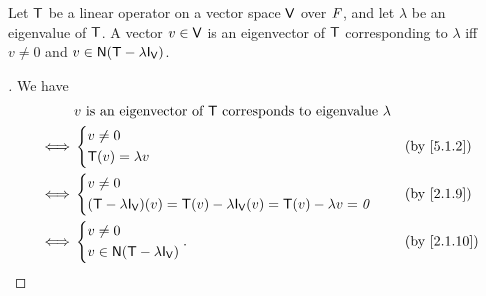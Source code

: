 \begin{thm}\label{5.4}
	Let \(\mathsf{T}\) be a linear operator on a vector space \(\mathsf{V}\) over \(\mathit{F}\), and let \(\lambda\) be an eigenvalue of \(\mathsf{T}\).
	A vector \(v \in \mathsf{V}\) is an eigenvector of \(\mathsf{T}\) corresponding to \(\lambda\) iff \(v \neq 0\) and \(v \in \ns{\T - \lambda \IT[\V]}\).
\end{thm}

\begin{proof}[]
	We have
	\begin{align*}
		     & v \text{ is an eigenvector of } \T \text{ corresponds to eigenvalue } \lambda               \\
		\iff & \begin{dcases}
			       v \neq 0 \\
			       \T(v) = \lambda v
		       \end{dcases}                                                                &  & \by{5.1.2} \\
		\iff & \begin{dcases}
			       v \neq 0 \\
			       (\T - \lambda \IT[\V])(v) = \T(v) - \lambda \IT[\V](v) = \T(v) - \lambda v = \zv
		       \end{dcases} &  & \by{2.1.9}             \\
		\iff & \begin{dcases}
			       v \neq 0 \\
			       v \in \ns{\T - \lambda \IT[\V]}
		       \end{dcases}.                                   &  & \by{2.1.10}
	\end{align*}
\end{proof}

